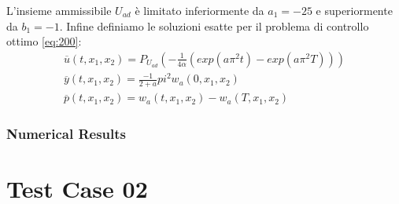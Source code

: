 L'insieme ammissibile $U_{ad}$ è limitato inferiormente da $a_1=-25$ e superiormente da $b_1=-1$.
Infine definiamo le soluzioni esatte per il problema di controllo ottimo \ref{eq:200}:
{\renewcommand\arraystretch{2}
\begin{equation}
\begin{array}{c}
\overline{u}(t,x_1,x_2) = P_{U_{ad}} \left( -\frac{1}{4\alpha}(exp(a{\pi}^2t)-exp(a{\pi}^2T)) \right) \\
\overline{y}(t,x_1,x_2) = \frac{- 1}{2 + a}{pi}^2w_a(0,x_1,x_2) \\
\overline{p}(t,x_1,x_2) = w_a(t,x_1,x_2) - w_a(T,x_1,x_2)
\end{array}
\label{eq:504}
\end{equation}
}

\subsubsection{Numerical Results}

\section{Test Case 02}
